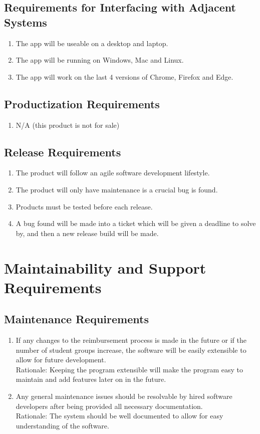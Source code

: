 \documentclass[12pt]{article}
\begin{document}
\subsection{Requirements for Interfacing with Adjacent Systems}
\begin{enumerate}
  \item The app will be useable on a desktop and laptop.
  \item The app will be running on Windows, Mac and Linux. 
  \item The app will work on the last 4 versions of Chrome, Firefox and Edge. 
\end{enumerate}
\subsection{Productization Requirements}
\begin{enumerate}
  \item N/A (this product is not for sale) 
\end{enumerate}
\subsection{Release Requirements}
\begin{enumerate}
  \item The product will follow an agile software development lifestyle.
  \item The product will only have maintenance is a crucial bug is found. 
  \item Products must be tested before each release. 
  \item A bug found will be made into a ticket which will be given a deadline to solve by, and then a new release build will be made.  
\end{enumerate}

\section{Maintainability and Support Requirements}
\subsection{Maintenance Requirements}

\begin{enumerate}
  
  \item If any changes to the reimbursement process is made in the future or if the number of student groups increase, the software will be easily extensible to allow for future development. \\
  Rationale: Keeping the program extensible will make the program easy to maintain and add features later on in the future.
  \item Any general maintenance issues should be resolvable by hired software developers after being provided all necessary documentation. \\
  Rationale: The system should be well documented to allow for easy understanding of the software.
\end{enumerate}
\end{document}
